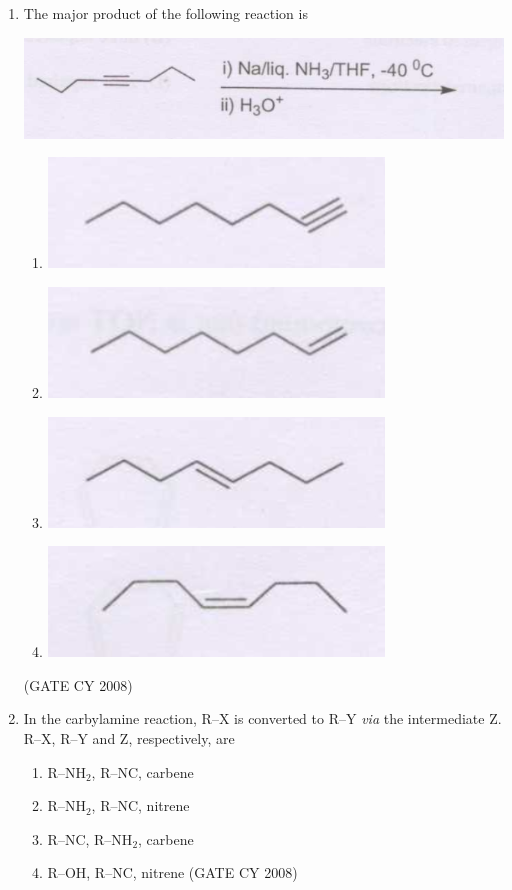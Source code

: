 \documentclass[12pt]{article}
\begin{document}
\begin{enumerate}
\item The major product of the following reaction is

\begin{center}
  \includegraphics[width=0.7\columnwidth]{figs/q10.png} 
\end{center}
\begin{enumerate}
    \item \includegraphics[width=0.3\columnwidth]{figs/q10 a.png}
    \item \includegraphics[width=0.3\columnwidth]{figs/q10 b.png}
    \item \includegraphics[width=0.3\columnwidth]{figs/q10 c.png}
    \item \includegraphics[width=0.3\columnwidth]{figs/q10 d.png}
\end{enumerate}
\hfill{(GATE CY 2008)}


 

\item In the carbylamine reaction, R–X is converted to R–Y \textit{via} the intermediate Z.\\
R–X, R–Y and Z, respectively, are
\begin{enumerate}
    \item R–NH$_2$, R–NC, carbene
    \item R–NH$_2$, R–NC, nitrene
    \item R–NC, R–NH$_2$, carbene
    \item R–OH, R–NC, nitrene     \hfill{(GATE CY 2008)}
\end{enumerate}
    


\end{enumerate}
\end{document}
